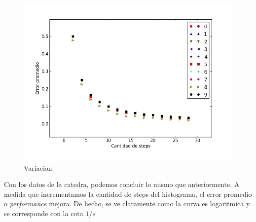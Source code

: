 \documentclass[10pt, a4paper,english,spanish,hidelinks]{article}
\begin{document}
\begin{figure}
  \centering
  \includegraphics[scale=0.6]{./imagenes/ejc2_variacion.png}
  \caption{Variacion}
\end{figure}


Con los datos de la catedra, podemos concluir lo mismo que anteriormente. A medida que incrementamos la cantidad de steps del histograma, el error promedio o \textit{performance} mejora. De hecho, se ve claramente como la curva es logaritmica y se corresponde con la cota $1/s$
\end{document}
